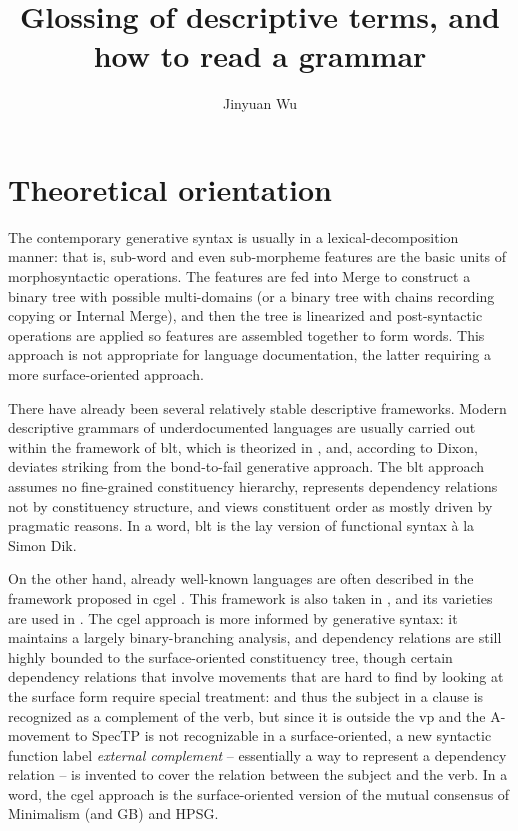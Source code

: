 \documentclass{article}
\title{Glossing of descriptive terms, and how to read a grammar}
\author{Jinyuan Wu}
\newcommand*{\term}[1]{\emph{#1}}
\newcommand{\ala}{à la}
\begin{document}
\maketitle

\section{Theoretical orientation}\label{sec:theory}

The contemporary generative syntax is usually in a lexical-decomposition manner:
that is, sub-word and even sub-morpheme features are the basic units of morphosyntactic operations.
The features are fed into Merge to construct a binary tree with possible multi-domains
(or a binary tree with chains recording copying or Internal Merge),
and then the tree is linearized and post-syntactic operations are applied 
so features are assembled together to form words.
This approach is not appropriate for language documentation,
the latter requiring a more surface-oriented approach.

There have already been several relatively stable descriptive frameworks.
Modern descriptive grammars of underdocumented languages 
are usually carried out within the framework of \ac{blt},
which is theorized in \citet{dixon2009basic1,dixon2010basic2,dixon2012basic3},
and, according to Dixon, deviates striking from the bond-to-fail generative approach.
The \ac{blt} approach assumes no fine-grained constituency hierarchy,
represents dependency relations not by constituency structure,
and views constituent order as mostly driven by pragmatic reasons.
In a word, \ac{blt} is the lay version of functional syntax \ala{} Simon Dik.

On the other hand, already well-known languages are often described in the framework proposed in 
\ac{cgel} \citep{cgel}.
This framework is also taken in \citet{abeille2021grande,huang2016reference},
and its varieties are used in \citet{demonte1999gramatica1,munoz2000gramatica2,bosque1999gramatica3}.
The \ac{cgel} approach is more informed by generative syntax:
it maintains a largely binary-branching analysis,
and dependency relations are still highly bounded to the surface-oriented constituency tree,
though certain dependency relations that involve movements that are hard to find by looking at the surface form 
require special treatment:
and thus the subject in a clause is recognized as a complement of the verb,
but since it is outside the \ac{vp} and the A-movement to SpecTP is not recognizable
in a surface-oriented,
a new syntactic function label \term{external complement} 
-- essentially a way to represent a dependency relation --
is invented to cover the relation between the subject and the verb.
In a word, the \ac{cgel} approach
is the surface-oriented version of the mutual consensus of Minimalism (and GB) and HPSG.
\end{document}
